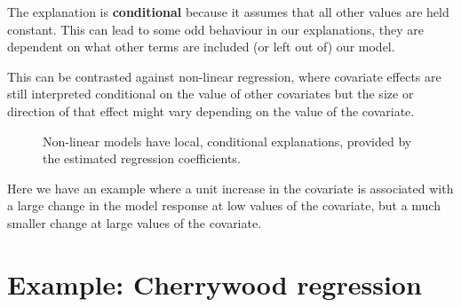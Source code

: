 \documentclass[
  letterpaper,
  DIV=11,
  numbers=noendperiod]{scrreprt}
\begin{document}
The explanation is \textbf{conditional} because it assumes that all
other values are held constant. This can lead to some odd behaviour in
our explanations, they are dependent on what other terms are included
(or left out of) our model.

This can be contrasted against non-linear regression, where covariate
effects are still interpreted conditional on the value of other
covariates but the size or direction of that effect might vary depending
on the value of the covariate.

\begin{figure}


\caption{\label{fig-interpreting-nonlinear-models}Non-linear models have
local, conditional explanations, provided by the estimated regression
coefficients.}

\end{figure}%

Here we have an example where a unit increase in the covariate is
associated with a large change in the model response at low values of
the covariate, but a much smaller change at large values of the
covariate.

\section{Example: Cherrywood
regression}\label{example-cherrywood-regression}
\end{document}
